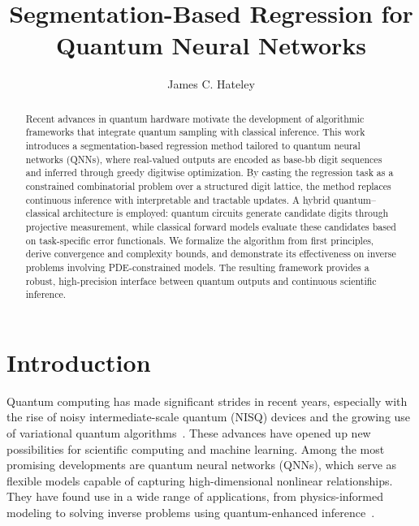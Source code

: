 \documentclass[aps,twocolumn,superscriptaddress,nofootinbib]{revtex4}
\begin{document}
\title{Segmentation-Based Regression for Quantum Neural Networks}

\author{James C. Hateley}

\begin{abstract}
Recent advances in quantum hardware motivate the development of algorithmic frameworks that integrate quantum sampling with classical inference. This work introduces a segmentation-based regression method tailored to quantum neural networks (QNNs), where real-valued outputs are encoded as base-bb digit sequences and inferred through greedy digitwise optimization. By casting the regression task as a constrained combinatorial problem over a structured digit lattice, the method replaces continuous inference with interpretable and tractable updates. A hybrid quantum–classical architecture is employed: quantum circuits generate candidate digits through projective measurement, while classical forward models evaluate these candidates based on task-specific error functionals. We formalize the algorithm from first principles, derive convergence and complexity bounds, and demonstrate its effectiveness on inverse problems involving PDE-constrained models. The resulting framework provides a robust, high-precision interface between quantum outputs and continuous scientific inference.
\end{abstract}

\maketitle
\section{Introduction}
Quantum computing has made significant strides in recent years, especially with the rise of noisy intermediate-scale quantum (NISQ) devices and the growing use of variational quantum algorithms~\cite{arute2019quantum,cerezo2021variational}. These advances have opened up new possibilities for scientific computing and machine learning. Among the most promising developments are quantum neural networks (QNNs), which serve as flexible models capable of capturing high-dimensional nonlinear relationships. They have found use in a wide range of applications, from physics-informed modeling to solving inverse problems using quantum-enhanced inference~\cite{farhi2018classification,schuld2020circuit,abbas2021power}.
\end{document}
